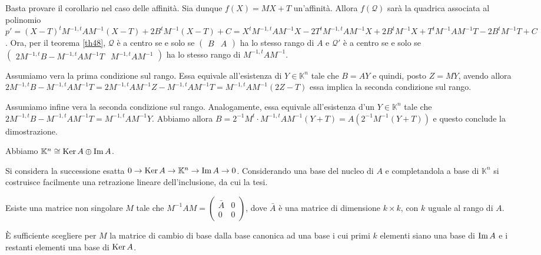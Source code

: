 \Proof Basta provare il corollario nel caso delle affinit\`a. Sia dunque $f(X) = MX + T$ un'affinit\`a. Allora $f(\mathcal{Q})$ sar\`a la quadrica associata al polinomio $p' = (X - T)^tM^{-1, t}AM^{-1}(X - T) + 2B^tM^{-1}(X - T) + C = X^tM^{-1,t}AM^{-1}X - 2 T^tM^{-1,t}AM^{-1}X + 2B^tM^{-1}X + T^tM^{-1}AM^{-1}T - 2B^tM^{-1}T + C$. Ora, per il teorema \ref{th48}, $\mathcal{Q}$ \`e a centro se e solo se $\left ( \begin{array}{c|c} B & A \end{array} \right )$ ha lo stesso rango di $A$ e $\mathcal{Q}'$ \`e a centro se e solo se $\left ( \begin{array}{c|c} 2M^{-1,t}B - M^{-1,t}AM^{-1}T & M^{-1,t}AM^{-1} \end{array} \right )$ ha lo stesso rango di $M^{-1,t}AM^{-1}$.
	\par Assumiamo vera la prima condizione sul rango. Essa equivale all'esistenza di $Y \in \mathbb{K}^n$ tale che $B = AY$ e quindi, posto $Z = MY$, avendo allora $2M^{-1,t}B - M^{-1,t}AM^{-1}T = 2M^{-1,t}AM^{-1}Z - M^{-1,t}AM^{-1}T = M^{-1,t}AM^{-1}(2Z - T)$ essa implica la seconda condizione sul rango.
	\par Assumiamo infine vera la seconda condizione sul rango. Analogamente, essa equivale all'esistenza d'un $Y \in \mathbb{K}^n$ tale che $2M^{-1,t}B - M^{-1,t}AM^{-1}T = M^{-1,t}AM^{-1}Y$. Abbiamo allora $B = 2^{-1}M^t \cdot M^{-1,t}AM^{-1}(Y + T) = A(2^{-1}M^{-1}(Y + T))$ e questo conclude la dimostrazione. \EndProof
\begin{Theorem}\label{th49}
	Abbiamo $\mathbb{K}^n \cong \operatorname{Ker} A \oplus \operatorname{Im} A$.
\end{Theorem}
\Proof Si considera la successione esatta $0 \rightarrow \operatorname{Ker} A \rightarrow \mathbb{K}^n \rightarrow \operatorname{Im} A \rightarrow 0$. Considerando una base del nucleo di $A$ e completandola a base di $\mathbb{K}^n$ si costruisce facilmente una retrazione lineare dell'inclusione, da cui la tesi. \EndProof
\begin{Corollary}\label{cor6}
	Esiste una matrice non singolare $M$ tale che $M^{-1}AM = \left ( \begin{array}{c|c} \bar{A} & 0\\ \hline 0 & 0 \end{array} \right )$, dove $\bar{A}$ \`e una matrice di dimensione $k \times k$, con $k$ uguale al rango di $A$.
\end{Corollary}
\Proof \`E sufficiente scegliere per $M$ la matrice di cambio di base dalla base canonica ad una base i cui primi $k$ elementi siano una base di $\operatorname{Im} A$ e i restanti elementi una base di $\operatorname{Ker} A$. \EndProof
